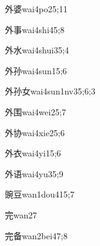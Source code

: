 \begin{verbete}{外婆}{wai4po2}{5;11}
\end{verbete}

\begin{verbete}{外事}{wai4shi4}{5;8}
\end{verbete}

\begin{verbete}{外水}{wai4shui3}{5;4}
\end{verbete}

\begin{verbete}{外孙}{wai4sun1}{5;6}
\end{verbete}

\begin{verbete}{外孙女}{wai4sun1nv3}{5;6;3}
\end{verbete}

\begin{verbete}{外围}{wai4wei2}{5;7}
\end{verbete}

\begin{verbete}{外协}{wai4xie2}{5;6}
\end{verbete}

\begin{verbete}{外衣}{wai4yi1}{5;6}
\end{verbete}

\begin{verbete}{外语}{wai4yu3}{5;9}
\end{verbete}

\begin{verbete}{豌豆}{wan1dou4}{15;7}
\end{verbete}

\begin{verbete}{完}{wan2}{7}
\end{verbete}

\begin{verbete}{完备}{wan2bei4}{7;8}
\end{verbete}

